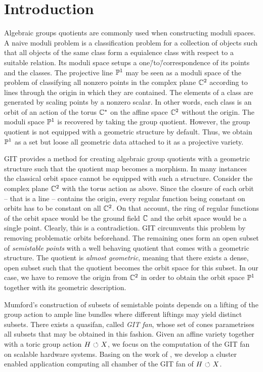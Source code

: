 \chapter{Introduction}

Algebraic groups quotients are commonly used when constructing moduli spaces. A naive moduli problem is a classification problem for a collection of objects such that all objects of the same class form a equialence class with respect to a suitable relation. Its moduli space setups a one\=/to\=/correspondence of its points and the classes. The projective line $\mathbb{P}^1$ may be seen as a moduli space of the problem of classifying all nonzero points in the complex plane $\mathbb{C}^2$ according to lines through the origin in which they are contained. The elements of a class are generated by scaling points by a nonzero scalar. In other words, each class is an orbit of an action of the torus $\mathbb{C}^*$ on the affine space $\mathbb{C}^2$ without the origin. The moduli space $\mathbb{P}^1$ is recovered by taking the group quotient. However, the group quotient is not equipped with a geometric structure by default. Thus, we obtain $\mathbb{P}^1$ as a set but loose all geometric data attached to it as a projective variety. 

\ac{GIT} provides a method for creating algebraic group quotients with a geometric structure such that the quotient map becomes a morphism. In many instances the classical orbit space cannot be equipped with such a structure. Consider the complex plane $\mathbb{C}^2$ with the torus action as above. Since the closure of each orbit -- that is a line -- contains the origin, every regular function being constant on orbits has to be constant on all $\mathbb{C}^2$. On that account, the ring of regular functions of the orbit space would be the ground field $\mathbb{C}$ and the orbit space would be a single point. Clearly, this is a contradiction. \ac{GIT} circumvents this problem by removing problematic orbits beforehand. The remaining ones form an open subset of \emph{semistable points} with a well behaving quotient that comes with a geometric structure. The quotient is \emph{almost geometric}, meaning that there exists a dense, open subset such that the quotient becomes the orbit space for this subset. In our case, we have to remove the origin from $\mathbb{C}^2$ in order to obtain the orbit space $\mathbb{P}^1$ together with its geometric description.

Mumford's construction of subsets of semistable points depends on a lifting of the group action to ample line bundles where different liftings may yield distinct subsets. There exists a quasifan, called \emph{GIT fan}, whose set of cones parametrises all subsets that may be obtained in this fashion. Given an affine variety together with a toric group action $H{\ \circlearrowleft\ } X$, we focus on the computation of the GIT fan on scalable hardware systems. Basing on the work of \citeauthor{gitfan_symmetry} \cite{gitfan_symmetry}, we develop a cluster enabled application computing all chamber of the GIT fan of $H{\ \circlearrowleft\ } X$.

